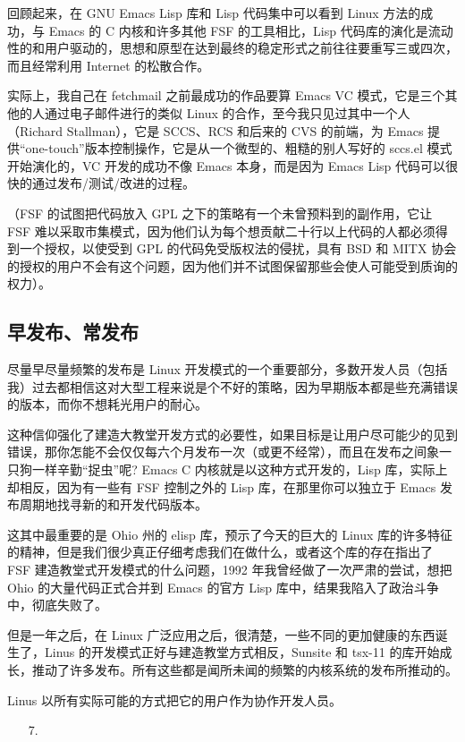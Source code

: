回顾起来，在 GNU Emacs Lisp 库和 Lisp 代码集中可以看到 Linux 方法的成功，与 Emacs 的 C 内核和许多其他 FSF 的工具相比，Lisp 代码库的演化是流动性的和用户驱动的，思想和原型在达到最终的稳定形式之前往往要重写三或四次，而且经常利用 Internet 的松散合作。


实际上，我自己在 fetchmail 之前最成功的作品要算 Emacs VC 模式，它是三个其他的人通过电子邮件进行的类似 Linux 的合作，至今我只见过其中一个人（Richard Stallman），它是 SCCS、RCS 和后来的 CVS 的前端，为 Emacs 提供“one-touch”版本控制操作，它是从一个微型的、粗糙的别人写好的 sccs.el 模式开始演化的，VC 开发的成功不像 Emacs 本身，而是因为 Emacs Lisp 代码可以很快的通过发布/测试/改进的过程。


（FSF 的试图把代码放入 GPL 之下的策略有一个未曾预料到的副作用，它让 FSF 难以采取市集模式，因为他们认为每个想贡献二十行以上代码的人都必须得到一个授权，以使受到 GPL 的代码免受版权法的侵扰，具有 BSD 和 MITX 协会的授权的用户不会有这个问题，因为他们并不试图保留那些会使人可能受到质询的权力）。


\subsection{早发布、常发布}


尽量早尽量频繁的发布是 Linux 开发模式的一个重要部分，多数开发人员（包括我）过去都相信这对大型工程来说是个不好的策略，因为早期版本都是些充满错误的版本，而你不想耗光用户的耐心。

这种信仰强化了建造大教堂开发方式的必要性，如果目标是让用户尽可能少的见到错误，那你怎能不会仅仅每六个月发布一次（或更不经常），而且在发布之间象一只狗一样辛勤“捉虫”呢? Emacs C 内核就是以这种方式开发的，Lisp 库，实际上却相反，因为有一些有 FSF 控制之外的 Lisp 库，在那里你可以独立于 Emacs 发布周期地找寻新的和开发代码版本。


这其中最重要的是 Ohio 州的 elisp 库，预示了今天的巨大的 Linux 库的许多特征的精神，但是我们很少真正仔细考虑我们在做什么，或者这个库的存在指出了 FSF 建造教堂式开发模式的什么问题，1992 年我曾经做了一次严肃的尝试，想把 Ohio 的大量代码正式合并到 Emacs 的官方 Lisp 库中，结果我陷入了政治斗争中，彻底失败了。


但是一年之后，在 Linux 广泛应用之后，很清楚，一些不同的更加健康的东西诞生了，Linus 的开发模式正好与建造教堂方式相反，Sunsite 和 tsx-11 的库开始成长，推动了许多发布。所有这些都是闻所未闻的频繁的内核系统的发布所推动的。


Linus 以所有实际可能的方式把它的用户作为协作开发人员。

\begin{enumerate}
\item[7.] 
\end{enumerate}


